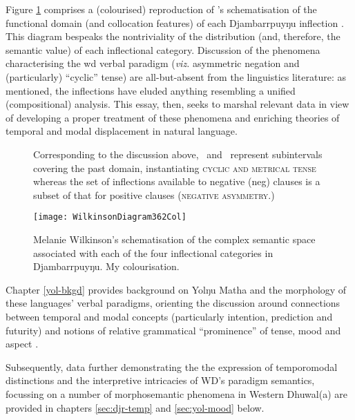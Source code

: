  Figure \ref{WilkDia} comprises a (colourised) reproduction of \citeauthor{Wilkinson1991}'s schematisation of the functional domain (and collocation features) of each Djambarrpuyŋu inflection \citeyearpar[326]{Wilkinson1991}. This diagram bespeaks the nontriviality of the distribution (and, therefore, the semantic value) of each inflectional category. Discussion of the phenomena characterising the \gls{wd} verbal paradigm (\textit{viz.} asymmetric negation and (particularly) ``cyclic'' tense) are all-but-absent from the linguistics literature: as mentioned, the inflections have eluded anything resembling a unified (compositional) analysis. This essay, then, seeks to marshal relevant data in view of developing a proper treatment of these phenomena and enriching theories of temporal and modal displacement in natural language. 
 

\begin{figure}[b!]\caption{Melanie Wilkinson's \citeyearpar[326]{Wilkinson1991} schematisation of the complex semantic space associated with each of the four inflectional categories in Djambarrpuyŋu. My colourisation.
}\label{WilkDia}

Corresponding to the discussion above, \I\ and \III\ represent subintervals covering the past domain, instantiating \textsc{cyclic and metrical tense} whereas the set of inflections available to negative (\gls{neg}) clauses is a subset of that for positive clauses (\textsc{negative asymmetry}.)

\centering
	\texttt{[image: WilkinsonDiagram362Col]}
\end{figure}

Chapter \ref{yol-bkgd} provides background on Yolŋu Matha and the morphology of these languages' verbal paradigms, orienting the discussion around connections between temporal and modal concepts (particularly intention, prediction and futurity) and notions of relative grammatical ``prominence'' of tense, mood and aspect \citep[\textit{cf.}][]{Bhat1999}. %



Subsequently, data further demonstrating the the expression of temporomodal distinctions and the interpretive intricacies of WD's paradigm semantics, focussing on a number of morphosemantic phenomena in Western Dhuwal(a) are provided in chapters \ref{sec:djr-temp} and \ref{sec:yol-mood} below. 


